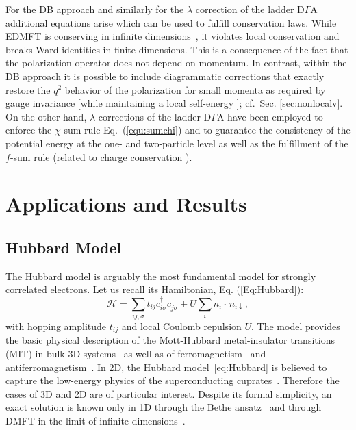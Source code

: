 \documentclass[rmp,aps,reprint,amsmath,amssymb,superscriptaddress,showpacs,nofootinbib]{revtex4-1}
\begin{document}
For the DB approach and similarly for the  $\lambda$ correction of the ladder  D$\Gamma$A additional equations arise which can be used to fulfill conservation laws. While EDMFT is conserving in infinite dimensions~\cite{Smith00}, it violates local conservation and breaks Ward identities in finite dimensions. This is a consequence of the fact that the polarization operator does not depend on momentum. In contrast, within the DB approach it is possible to include diagrammatic corrections that exactly restore the $q^{2}$ behavior of the polarization for small momenta as required by gauge invariance [while maintaining a local self-energy ]; cf.~Sec. \ref{sec:nonlocalv}. On the other hand,  $\lambda$ corrections of the ladder  D$\Gamma$A  \cite{Katanin2009} have been employed to enforce the $\chi$ sum rule Eq.~(\ref{equ:sumchi}) and to guarantee the consistency of the potential energy at the one- and two-particle level as well as the fulfillment of the $f$-sum rule (related to charge conservation ).


\section{Applications and Results}
\label{Sec:results}

\subsection{Hubbard Model}
\label{sec:hubbard}
\label{sec:Results_HF}

The Hubbard model is arguably  the most fundamental model for strongly correlated electrons. Let us recall its  Hamiltonian, Eq. (\ref{Eq:Hubbard}):
\begin{equation}
\mathcal{H} = \sum_{ij,\sigma} t_{ij} c_{i\sigma}^{\dagger}c_{j\sigma}^{\phantom{\dagger}} + U\sum_{i}n_{i\uparrow}n_{i\downarrow},
\label{eq:Hubbard}
\end{equation}
with hopping amplitude  $t_{ij}$ and  local Coulomb repulsion $U$. The model provides the basic physical description of the Mott-Hubbard metal-insulator transitions (MIT) in bulk 3D systems~\cite{Gebhard1997,Imada1998} as well as of ferromagnetism~\cite{Mielke1993,Vollhardt98a} and antiferromagnetism~\cite{Jarrell1992}. In 2D, the Hubbard model~\eqref{eq:Hubbard} is believed to capture the low-energy physics of the superconducting cuprates~\cite{Dagotto94,Scalapino12}. Therefore the cases of 3D and 2D are  of particular interest. Despite its formal simplicity, an exact solution is known only in 1D through the Bethe ansatz~\cite{Lieb1968} and through DMFT in the limit of infinite dimensions~\cite{Metzner1989,Georges1996}.
\end{document}

